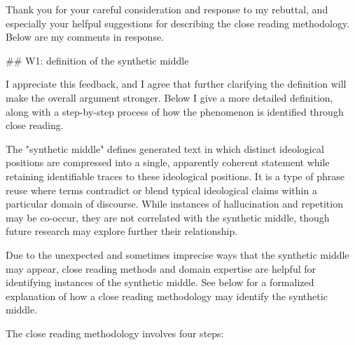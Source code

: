 \documentclass[11pt]{article}
\author{fcalado}
\date{\today}
\title{}
\begin{document}
\tableofcontents

Thank you for your careful consideration and response to my rebuttal,
and especially your helfpul suggestions for describing the close
reading methodology. Below are my comments in response.

\#\# W1: definition of the synthetic middle

I appreciate this feedback, and I agree that further clarifying the
definition will make the overall argument stronger. Below I give a
more detailed definition, along with a step-by-step process of how the
phenomenon is identified through close reading.

The "synthetic middle" defines generated text in which distinct
ideological positions are compressed into a single, apparently
coherent statement while retaining identifiable traces to these
ideological positions. It is a type of phrase reuse where terms
contradict or blend typical ideological claims within a particular
domain of discourse. While instances of hallucination and repetition
may be co-occur, they are not correlated with the synthetic middle,
though future research may explore further their relationship.

Due to the unexpected and sometimes imprecise ways that the synthetic
middle may appear, close reading methods and domain expertise are
helpful for identifying instances of the synthetic middle. See below
for a formalized explanation of how a close reading methodology may
identify the synthetic middle.

The close reading methodology involves four steps:
\end{document}
